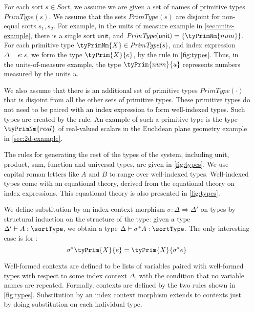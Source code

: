 For each sort $s \in \mathit{Sort}$, we assume we are given a set of
names of primitive types $\mathit{PrimType}(s)$. We assume that the
sets $\mathit{PrimType}(s)$ are disjoint for non-equal sorts $s_1,
s_2$. For example, in the units of measure example in
\autoref{sec:units-example}, there is a single sort $\mathsf{unit}$,
and $\mathit{PrimType}(\mathsf{unit}) = \{\tyPrimNm{num}\}$. For each
primitive type $\tyPrimNm{X} \in \mathit{PrimType}(s)$, and index
expression $\Delta \vdash e : s$, we form the type $\tyPrim{X}{e}$, by
the  rule in \autoref{fig:types}. Thus, in the
units-of-measure example, the type $\tyPrim{num}{u}$ represents
numbers measured by the units $u$.

We also assume that there is an additional set of primitive types
$\mathit{PrimType}(\cdot)$ that is disjoint from all the other sets of
primitive types. These primitive types do not need to be paired with
an index expression to form well-indexed types. Such types are created
by the  rule. An example of such a primitive type
is the type $\tyPrimNm{real}$ of real-valued scalars in the Euclidean
plane geometry example in \autoref{sec:2d-example}.

The rules for generating the rest of the types of the system,
including unit, product, sum, function and universal types, are given
in \autoref{fig:types}. We use capital roman letters like $A$ and $B$
to range over well-indexed types. Well-indexed types come with an
equational theory, derived from the equational theory on index
expressions. This equational theory is also presented in
\autoref{fig:types}.

We define substitution by an index context morphism $\sigma : \Delta
\Rightarrow \Delta'$ on types by structural induction on the structure
of the type: given a type $\Delta' \vdash A : \sortType$, we obtain a
type $\Delta \vdash \sigma^*A : \sortType$. The only interesting case
is for :
\begin{displaymath}
  \sigma^*\tyPrim{X}{e} = \tyPrim{X}{\sigma^*e}
\end{displaymath}

Well-formed contexts are defined to be lists of variables paired with
well-formed types with respect to some index context $\Delta$, with
the condition that no variable names are repeated. Formally, contexts
are defined by the two rules shown in
\autoref{fig:types}. Substitution by an index context morphism extends
to contexts just by doing substitution on each individual type.

